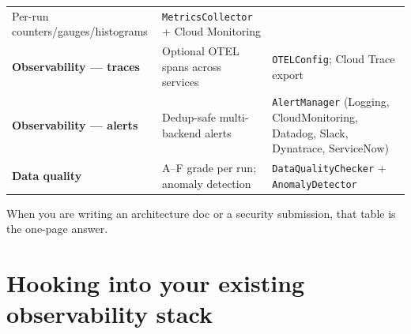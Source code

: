 \documentclass[
  11pt,
  british,
  oneside]{book}
\begin{document}
\begin{longtable}[]{@{}lll@{}}
\begin{minipage}[t]{0.30\columnwidth}
Per-run counters/gauges/histograms\strut
\end{minipage} & \begin{minipage}[t]{0.30\columnwidth}\raggedright
\texttt{MetricsCollector} + Cloud Monitoring\strut
\end{minipage}\tabularnewline
\begin{minipage}[t]{0.30\columnwidth}\raggedright
\textbf{Observability --- traces}\strut
\end{minipage} & \begin{minipage}[t]{0.30\columnwidth}\raggedright
Optional OTEL spans across services\strut
\end{minipage} & \begin{minipage}[t]{0.30\columnwidth}\raggedright
\texttt{OTELConfig}; Cloud Trace export\strut
\end{minipage}\tabularnewline
\begin{minipage}[t]{0.30\columnwidth}\raggedright
\textbf{Observability --- alerts}\strut
\end{minipage} & \begin{minipage}[t]{0.30\columnwidth}\raggedright
Dedup-safe multi-backend alerts\strut
\end{minipage} & \begin{minipage}[t]{0.30\columnwidth}\raggedright
\texttt{AlertManager} (Logging, CloudMonitoring, Datadog, Slack,
Dynatrace, ServiceNow)\strut
\end{minipage}\tabularnewline
\begin{minipage}[t]{0.30\columnwidth}\raggedright
\textbf{Data quality}\strut
\end{minipage} & \begin{minipage}[t]{0.30\columnwidth}\raggedright
A--F grade per run; anomaly detection\strut
\end{minipage} & \begin{minipage}[t]{0.30\columnwidth}\raggedright
\texttt{DataQualityChecker} + \texttt{AnomalyDetector}\strut
\end{minipage}\tabularnewline
\bottomrule
\end{longtable}

When you are writing an architecture doc or a security submission, that
table is the one-page answer.

\hypertarget{hooking-into-your-existing-observability-stack}{%
\section{Hooking into your existing observability
stack}\label{hooking-into-your-existing-observability-stack}}
\end{document}
